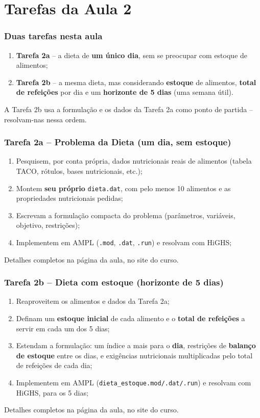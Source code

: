 \documentclass[fleqn]{beamer}
\begin{document}
\section{Tarefas da Aula 2}

\begin{frame}
	\frametitle{Duas tarefas nesta aula}
	\begin{enumerate}
		\item \textbf{Tarefa 2a} -- a dieta de \textbf{um único dia},
			sem se preocupar com estoque de alimentos;
		\item \textbf{Tarefa 2b} -- a mesma dieta, mas considerando
			\textbf{estoque} de alimentos, \textbf{total de refeições}
			por dia e um \textbf{horizonte de 5 dias} (uma semana
			útil).
	\end{enumerate}
	\vspace{0.2cm}
	A Tarefa 2b usa a formulação e os dados da Tarefa 2a como ponto de
	partida -- resolvam-nas nessa ordem.
\end{frame}

\begin{frame}
	\frametitle{Tarefa 2a -- Problema da Dieta (um dia, sem estoque)}
	\begin{enumerate}
		\item Pesquisem, por conta própria, dados nutricionais reais de
			alimentos (tabela TACO, rótulos, bases nutricionais, etc.);
		\item Montem \textbf{seu próprio} \texttt{dieta.dat}, com pelo
			menos 10 alimentos e as propriedades nutricionais pedidas;
		\item Escrevam a formulação compacta do problema (parâmetros,
			variáveis, objetivo, restrições);
		\item Implementem em AMPL (\texttt{.mod}, \texttt{.dat},
			\texttt{.run}) e resolvam com HiGHS;
	\end{enumerate}
	\vspace{0.2cm}
	Detalhes completos na página da aula, no site do curso.
\end{frame}

\begin{frame}
	\frametitle{Tarefa 2b -- Dieta com estoque (horizonte de 5 dias)}
	\begin{enumerate}
		\item Reaproveitem os alimentos e dados da Tarefa 2a;
		\item Definam um \textbf{estoque inicial} de cada alimento e o
			\textbf{total de refeições} a servir em cada um dos 5 dias;
		\item Estendam a formulação: um índice a mais para o
			\textbf{dia}, restrições de \textbf{balanço de estoque}
			entre os dias, e exigências nutricionais multiplicadas
			pelo total de refeições de cada dia;
		\item Implementem em AMPL (\texttt{dieta\_estoque.mod/.dat/.run})
			e resolvam com HiGHS, para os 5 dias;
	\end{enumerate}
	\vspace{0.2cm}
	Detalhes completos na página da aula, no site do curso.
\end{frame}
\end{document}
